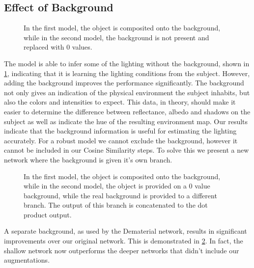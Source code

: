 \documentclass[ %
                    author={Gavin Parker},
                supervisor={Dr. Neill Campbell},
                    degree={MEng},
                     title={Deep Learning for Illumination Estimation from Stereo Images},
                  subtitle={},
                      type={Research},
                      year={2018} ]{dissertation}
\begin{document}
\subsection{Effect of Background}
\begin{figure}[H]
\setlength\figureheight{6cm}
\setlength\figurewidth{12cm}
\centering

\caption{In the first model, the object is composited onto the background, while in the second model, the background is not present and replaced with 0 values.}
\label{fig:bg_comp}
\end{figure}
The model is able to infer some of the lighting without the background, shown in \ref{fig:bg_comp}, indicating that it is learning the lighting conditions from the subject. However, adding the background improves the performance significantly. The background not only gives an indication of the physical environment the subject inhabits, but also the colors and intensities to expect. This data, in theory, should make it easier to determine the difference between reflectance, albedo and shadows on the subject as well as indicate the hue of the resulting environment map. Our results indicate that the background information is useful for estimating the lighting accurately. For a robust model we cannot exclude the background, however it cannot be included in our Cosine Similarity steps. To solve this we present a new network where the background is given it's own branch.
\begin{figure}[H]
\setlength\figureheight{6cm}
\setlength\figurewidth{12cm}
\centering

\caption{In the first model, the object is composited onto the background, while in the second model, the object is provided on a 0 value background, while the real background is provided to a different branch. The output of this branch is concatenated to the dot product output.}
\label{fig:bg_comp2}
\end{figure}
A separate background, as used by the Dematerial network, results in significant improvements over our original network. This is demonstrated in \ref{fig:bg_comp2}. In fact, the shallow network now outperforms the deeper networks that didn't include our augmentations.
\end{document}
